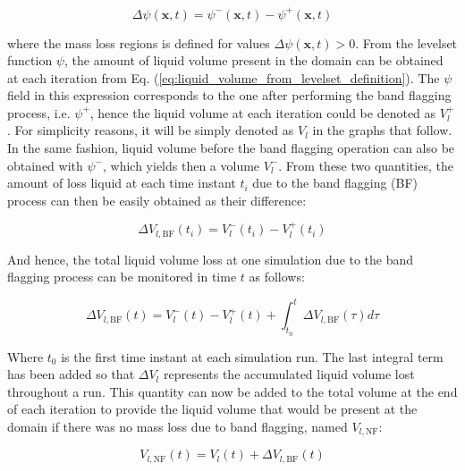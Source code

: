 \begin{equation}
\label{eq:ch5_LS_loss_delta_psi_field}
\Delta \psi \left( \textbf{x}, t \right) = \psi^- \left( \textbf{x}, t \right)  - \psi^+ \left( \textbf{x}, t \right) 
\end{equation}

where the mass loss regions is defined for values $\Delta \psi \left( \textbf{x}, t \right) > 0$. From the levelset function $\psi$, the amount of liquid volume present in the domain can be obtained at each iteration from Eq. (\ref{eq:liquid_volume_from_levelset_definition}). The $\psi$ field in this expression corresponds to the one after performing the band flagging process, i.e. $\psi^+$, hence the liquid volume at each iteration could be denoted as $V_l^+$. For simplicity reasons, it will be simply denoted as $V_l$ in the graphs that follow. In the same fashion, liquid volume before the band flagging operation can also be obtained with $\psi^-$, which yields then a volume $V_l^-$. From these two quantities, the amount of loss liquid at each time instant $t_i$ due to the band flagging (BF) process can then be easily obtained as their difference:

\begin{equation}
\Delta V_{l,\mathrm{BF}} \left( t_i \right)  = V_l^- \left( t_i \right)  - V_l^+ \left( t_i \right)
\end{equation}

And hence, the total liquid volume loss at one simulation due to the band flagging process can be monitored in time $t$ as follows:

\begin{equation}
\label{eq:ch5_LS_loss_delta_Vl_BF}
\Delta V_{l,\mathrm{BF}}  \left( t \right) = V_l^- \left( t \right)  - V_l^+ \left( t \right) + \int_{t_0}^t \Delta V_{l,\mathrm{BF}} \left( \tau \right) d\tau
\end{equation}

Where $t_0$ is the first time instant at each simulation run. The last integral term has been added so that $\Delta V_l$ represents the accumulated liquid volume lost throughout a run. This quantity can now be added to the total volume at the end of each iteration to provide the liquid volume that would be present at the domain if there was no mass loss due to band flagging, named $V_{l,\mathrm{NF}}$:

\begin{equation}
\label{eq:ch5_liquid_volume_no_flagging}
V_{l,\mathrm{NF}}  \left( t \right) = V_l  \left( t \right) + \Delta V_{l,\mathrm{BF}} \left( t \right)
\end{equation}

